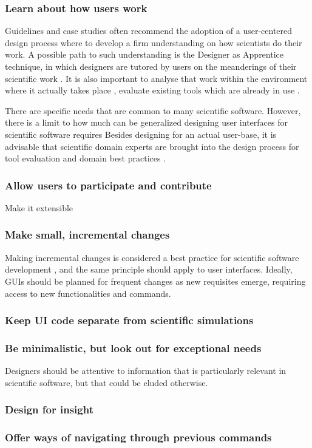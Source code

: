 \subsubsection{Learn about how users work}

Guidelines and case studies often recommend the adoption of a user-centered design process where to develop a firm understanding on how scientists do their work.  A possible path to such understanding is the Designer as Apprentice technique, in which designers are tutored by users on the meanderings of their scientific work \cite{Springmeyer:1993}.  It is also important to analyse that work within the environment where it actually takes place \cite{Pancake:1996}, evaluate existing tools which are already in use \cite{Javahery:2004}.  


There are specific needs that are common to many scientific software. However, there is a limit to how much can be generalized designing user interfaces for scientific software requires
Besides designing for an actual user-base, it is advisable that scientific domain experts are brought into the design process for tool evaluation \cite{ Keefe:2010} and domain best practices \cite{Schraefel:2004,  DeMatos:2013}.


\subsubsection{Allow users to participate and contribute} Make it extensible



\subsubsection{Make small, incremental changes}
Making incremental changes is considered a best practice for scientific software development  \cite{bestprSC}, and the same principle should apply to user interfaces. Ideally, GUIs should be planned for frequent changes as new requisites emerge, requiring access to new functionalities and commands. 

\subsubsection{Keep UI code separate from scientific simulations}

\subsubsection{Be minimalistic, but look out for exceptional needs}

Designers should be attentive to information that is particularly relevant in scientific software, but that could be eluded otherwise.    

\subsubsection{Design for insight}

\subsubsection{Offer ways of navigating through previous commands}



